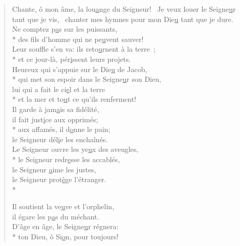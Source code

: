 
\begin{verse}
Chante, ô mon âme, la lou\underline{a}nge du Seigneur!~\psalmdagger
{}Je veux louer le Seigne\underline{u}r tant que je vis,~\psalmstar
chanter mes hymnes pour mon Die\underline{u} tant que je dure. \\

Ne comptez p\underline{a}s sur les puissants, \\*
des fils d’homme qui ne pe\underline{u}vent sauver! \\
Leur souffle s’en va: ils reto\underline{u}rnent à la terre ; \\*
et ce jour-là, pér\underline{i}ssent leurs projets. \\

Heureux qui s’appuie sur le Die\underline{u} de Jacob, \\*
qui met son espoir dans le Seigne\underline{u}r son Dieu, \\
lui qui a fait le ci\underline{e}l et la terre \\*
et la mer et to\underline{u}t ce qu’ils renferment! \\

Il garde à jam\underline{a}is sa fidélité, \\
il fait just\underline{i}ce aux opprimés; \\*
aux affamés, il d\underline{o}nne le pain; \\
le Seigneur dél\underline{i}e les enchaînés. \\

Le Seigneur ouvre les ye\underline{u}x des aveugles, \\*
le Seigneur redr\underline{e}sse les accablés, \\
le Seigneur \underline{a}ime les justes, \\
le Seigneur prot\underline{è}ge l’étranger. \\*

Il soutient la ve\underline{u}ve et l’orphelin, \\
il égare les p\underline{a}s du méchant. \\
D’âge en âge, le Seigne\underline{u}r régnera: \\*
ton Dieu, ô Si\underline{o}n, pour toujours! \\
\end{verse}


